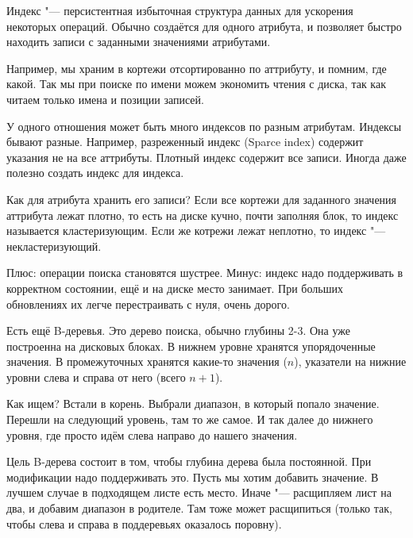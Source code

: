 \begin{Def}
	Индекс "--- персистентная избыточная структура данных для ускорения некоторых операций.
	Обычно создаётся для одного атрибута, и позволяет быстро находить записи с заданными значениями атрибутами.
\end{Def}
Например, мы храним в кортежи отсортированно по аттрибуту, и помним, где какой.
Так мы при поиске по имени можем экономить чтения с диска, так как читаем только имена и позиции записей.

У одного отношения может быть много индексов по разным атрибутам.
Индексы бывают разные.
Например, разреженный индекс (Sparce index) содержит указания не на все аттрибуты.
Плотный индекс содержит все записи. Иногда даже полезно создать индекс для индекса.

Как для атрибута хранить его записи?
Если все кортежи для заданного значения аттрибута лежат плотно, то есть на диске кучно, почти заполняя блок, то индекс называется кластеризующим.
Если же котрежи лежат неплотно, то индекс "--- некластеризующий.

Плюс: операции поиска становятся шустрее.
Минус: индекс надо поддерживать в корректном состоянии, ещё и на диске место занимает. При больших обновлениях их легче перестраивать с нуля, очень дорого.

Есть ещё B-деревья.
Это дерево поиска, обычно глубины 2-3.
Она уже построенна на дисковых блоках.
В нижнем уровне хранятся упорядоченные значения.
В промежуточных хранятся какие-то значения ($n$), указатели на нижние уровни слева и справа от него (всего $n+1$).

Как ищем? Встали в корень. Выбрали диапазон, в который попало значение.
Перешли на следующий уровень, там то же самое.
И так далее до нижнего уровня, где просто идём слева направо до нашего значения.

Цель B-дерева состоит в том, чтобы глубина дерева была постоянной.
При модификации надо поддерживать это.
Пусть мы хотим добавить значение.
В лучшем случае в подходящем листе есть место.
Иначе "--- расщипляем лист на два, и добавим диапазон в родителе.
Там тоже может расщипиться (только так, чтобы слева и справа в поддеревьях оказалось поровну).
